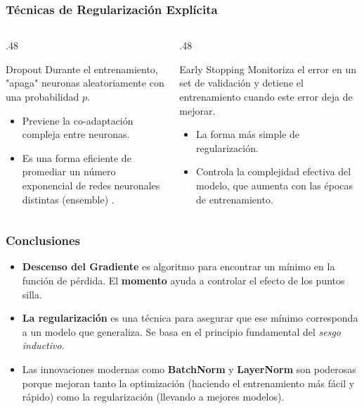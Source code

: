 \documentclass[aspectratio=169, 10pt]{beamer}
\begin{document}
\begin{frame}
	\frametitle{Técnicas de Regularización Explícita}
	
	\begin{columns}[T]
		\begin{column}{.48\textwidth}
		
			\begin{block}{Dropout}
				Durante el entrenamiento, "apaga" neuronas aleatoriamente con una probabilidad \(p\).
				\begin{itemize}
					\item[-] Previene la co-adaptación compleja entre neuronas.
					\item[-] Es una forma eficiente de promediar un número exponencial de redes neuronales distintas (ensemble) .
				\end{itemize}
			\end{block}
		\end{column}
		
		\begin{column}{.48\textwidth}
	
		
			\begin{block}{Early Stopping}
				Monitoriza el error en un set de validación y detiene el entrenamiento cuando este error deja de mejorar.
				\begin{itemize}
					\item[-] La forma más simple de regularización.
					\item[-] Controla la complejidad efectiva del modelo, que aumenta con las épocas de entrenamiento.
				\end{itemize}
			\end{block}
		\end{column}
	\end{columns}
\end{frame}

\begin{frame}
	\frametitle{Conclusiones}
	
	\begin{itemize}
		\item \textbf{Descenso del Gradiente} es algoritmo para encontrar un mínimo en la función de pérdida. El \textbf{momento} ayuda a controlar el efecto de los puntos silla.
		
		\item \textbf{La regularización} es una técnica para asegurar que ese mínimo corresponda a un modelo que generaliza. Se basa en el principio fundamental del \textit{sesgo inductivo}.
		
		\item Las innovaciones modernas como \textbf{BatchNorm} y \textbf{LayerNorm} son poderosas porque mejoran tanto la optimización (haciendo el entrenamiento más fácil y rápido) como la regularización (llevando a mejores modelos).
		
		
	\end{itemize}
	
	
\end{frame}

	
\end{document}
